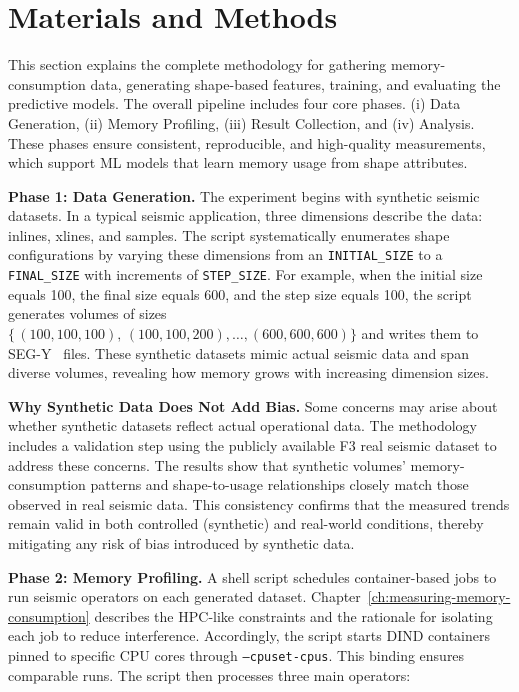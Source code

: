 \section{Materials and Methods}
\label{sec:pmc-materials-and-methods}

This section explains the complete methodology for gathering memory-consumption data, generating shape-based features, training, and evaluating the predictive models.
The overall pipeline includes four core phases.
(i) Data Generation,
(ii) Memory Profiling,
(iii) Result Collection,
and (iv) Analysis.
These phases ensure consistent, reproducible, and high-quality measurements, which support \ac{ML} models that learn memory usage from shape attributes.

\vspace{1em}
\noindent
\textbf{Phase 1: Data Generation.}
The experiment begins with synthetic seismic datasets.
In a typical seismic application, three dimensions describe the data: inlines, xlines, and samples.
The script systematically enumerates shape configurations by varying these dimensions from an \texttt{INITIAL\_SIZE} to a \texttt{FINAL\_SIZE} with increments of \texttt{STEP\_SIZE}.
For example, when the initial size equals 100, the final size equals 600, and the step size equals 100, the script generates volumes of sizes
\(\{\,(100,100,100),\,(100,100,200),\dots,(600,600,600)\}\)
and writes them to \ac{SEG-Y}~\cite{barry1975segy} files.
These synthetic datasets mimic actual seismic data and span diverse volumes, revealing how memory grows with increasing dimension sizes.

\vspace{1em}
\noindent
\textbf{Why Synthetic Data Does Not Add Bias.}
Some concerns may arise about whether synthetic datasets reflect actual operational data.
The methodology includes a validation step using the publicly available F3 real seismic dataset to address these concerns.
The results show that synthetic volumes' memory-consumption patterns and shape-to-usage relationships closely match those observed in real seismic data.
This consistency confirms that the measured trends remain valid in both controlled (synthetic) and real-world conditions, thereby mitigating any risk of bias introduced by synthetic data.

\vspace{1em}
\noindent
\textbf{Phase 2: Memory Profiling.}
A shell script schedules container-based jobs to run seismic operators on each generated dataset.
Chapter~\ref{ch:measuring-memory-consumption} describes the \ac{HPC}-like constraints and the rationale for isolating each job to reduce interference.
Accordingly, the script starts \ac{DIND} containers pinned to specific \ac{CPU} cores through \texttt{--cpuset-cpus}.
This binding ensures comparable runs.
The script then processes three main operators:

